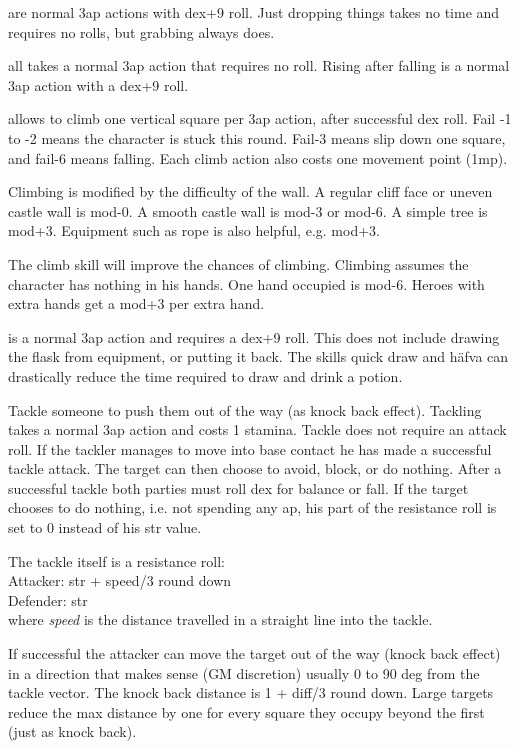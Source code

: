  are normal 3ap actions with dex+9 roll. Just dropping things takes no time and requires no rolls, but grabbing always does.


 all takes a normal 3ap action that requires no roll. Rising after falling is a normal 3ap action with a dex+9 roll.


 allows to climb one vertical square per 3ap action, after successful dex roll. Fail -1 to -2 means the character is stuck this round. Fail-3 means slip down one square, and fail-6 means falling. Each climb action also costs one movement point (1mp).

Climbing is modified by the difficulty of the wall. A regular cliff face or uneven castle wall is mod-0. A smooth castle wall is mod-3 or mod-6. A simple tree is mod+3. Equipment such as rope is also helpful, e.g. mod+3.

The climb skill will improve the chances of climbing.
Climbing assumes the character has nothing in his hands. One hand occupied is mod-6. Heroes with extra hands get a mod+3 per extra hand.


 is a normal 3ap action and requires a dex+9 roll. This does not include drawing the flask from equipment, or putting it back. The skills quick draw and häfva can drastically reduce the time required to draw and drink a potion.


 Tackle someone to push them out of the way (as knock back effect). Tackling takes a normal 3ap action and costs 1 stamina. Tackle does not require an attack roll. If the tackler manages to move into base contact he has made a successful tackle attack. The target can then choose to avoid, block, or do nothing. After a successful tackle both parties must roll dex for balance or fall. If the target chooses to do nothing, i.e. not spending any ap, his part of the resistance roll is set to 0 instead of his str value.

The tackle itself is a resistance roll: \\
Attacker: str + speed/3 round down \\
Defender: str\\
where \emph{speed} is the distance travelled in a straight line into the tackle.

If successful the attacker can move the target out of the way (knock back effect) in a direction that makes sense (GM discretion) usually 0 to 90 deg from the tackle vector. The knock back distance is 1 + diff/3 round down. Large targets reduce the max distance by one for every square they occupy beyond the first (just as knock back).

